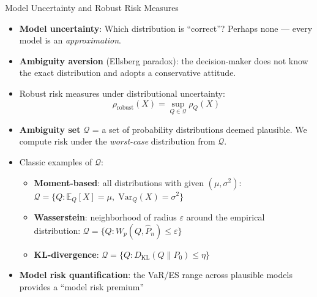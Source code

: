 \documentclass[9pt, aspectratio=169, t]{beamer}
\theoremstyle{definition}
\newcommand{\E}{\mathbb{E}}
\newcommand{\Var}{\text{Var}}
\begin{document}
\begin{frame}{Model Uncertainty and Robust Risk Measures}
\begin{itemize}\setlength\itemsep{2pt}
\item \textbf{Model uncertainty}: Which distribution is ``correct''? Perhaps none --- every model is an \emph{approximation}.
\item \textbf{Ambiguity aversion} (Ellsberg paradox): the decision-maker does not know the exact distribution and adopts a conservative attitude.
\item Robust risk measures under distributional uncertainty:
\[
\rho_{\text{robust}}(X) = \sup_{Q \in \mathcal{Q}} \rho_Q(X)
\]
\item \textbf{Ambiguity set} $\mathcal{Q}$ = a set of probability distributions deemed plausible. We compute risk under the \emph{worst-case} distribution from $\mathcal{Q}$.
\item Classic examples of $\mathcal{Q}$:
\begin{itemize}
    \item \textbf{Moment-based}: all distributions with given $(\mu, \sigma^2)$: $\mathcal{Q} = \{Q : \E_Q[X] = \mu,\; \Var_Q(X) = \sigma^2\}$
    \item \textbf{Wasserstein}: neighborhood of radius $\varepsilon$ around the empirical distribution: $\mathcal{Q} = \{Q : W_p(Q, \hat{P}_n) \leq \varepsilon\}$
    \item \textbf{KL-divergence}: $\mathcal{Q} = \{Q : D_{\text{KL}}(Q \| P_0) \leq \eta\}$
\end{itemize}
\item \textbf{Model risk quantification}: the VaR/ES range across plausible models provides a ``model risk premium''
\end{itemize}
\end{frame}
\end{document}
